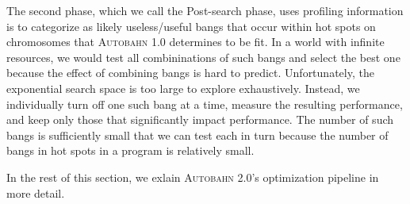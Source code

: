\documentclass[format=sigplan, review=true]{acmart}
\newcommand{\hotspots}[0]{hot spots}
\newcommand{\useful}[0]{useful}
\newcommand{\useless}[0]{useless}
\newcommand{\Ao}[0]{\textsc{Autobahn 1.0}}
\newcommand{\At}[0]{\textsc{Autobahn 2.0}}
\newcommand{\Postopt}[0]{Post-search}
\begin{document}
The second phase, which we call the \Postopt{} phase, uses profiling
information is to categorize as likely \useless{}/\useful{} bangs that occur within \hotspots{} on
chromosomes that \Ao{} determines to be fit.  In a world with infinite resources,
we would test all combininations of such bangs and select the best one
because the effect of combining bangs is hard to predict.
Unfortunately, the exponential search space is too large to explore
exhaustively. Instead, we individually turn off one such bang at a
time, measure the resulting performance, and keep only those that
significantly impact performance.  The number of such bangs is
sufficiently small that we can test each in turn because the number of
bangs in \hotspots{} in a program is relatively small.

In the rest of this section, we exlain \At{}'s optimization pipeline
in more detail.
\end{document}
